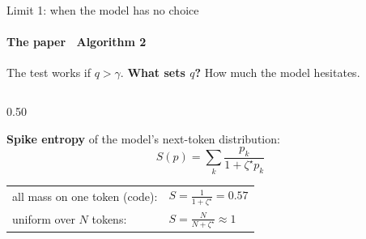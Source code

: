 \documentclass[aspectratio=169,10pt,t]{beamer}
\newcommand{\key}[1]{\textcolor{calblue}{\textbf{#1}}}
\newcommand{\tightmath}{%
  \setlength{\abovedisplayskip}{3pt}%
  \setlength{\belowdisplayskip}{3pt}%
  \setlength{\abovedisplayshortskip}{1pt}%
  \setlength{\belowdisplayshortskip}{1pt}%
}
\begin{document}
\begin{frame}{Limit 1: when the model has no choice}
  \framesubtitle{The paper \textperiodcentered\ Algorithm 2}
  \tightmath
  The test works if $q > \gamma$. \key{What sets $q$?} How much the model hesitates.
  \vspace{0.3em}
  \begin{columns}[T,onlytextwidth]
    \begin{column}{0.50\textwidth}
      \raggedright
      \key{Spike entropy} of the model's next-token distribution:
      \[ S(p) = \sum_k \frac{p_k}{1+\zeta^\star p_k} \]
      {\small
      \begin{tabular}{@{}ll@{}}
        all mass on one token (code): & $S = \frac{1}{1+\zeta^\star} = 0.57$ \\[0.3em]
        uniform over $N$ tokens: & $S = \frac{N}{N+\zeta^\star} \approx 1$ \\
      \end{tabular}}
      \vspace{0.5em}


\end{column}
\end{columns}
\end{frame}
\end{document}
